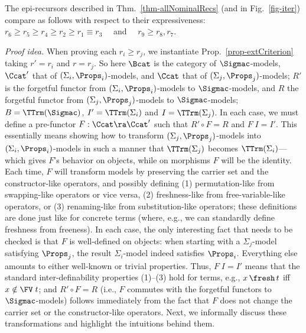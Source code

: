 
\begin{thm} \rm
	\label{thm-expr}
	The epi-recursors described in Thm.~\ref{thm-allNominalRecs} (and in Fig.~\ref{fig-iter}) compare as follows with respect to their expressiveness: 
	 \ \ $r_6 \geq r_5 \geq r_4 \geq r_2 \geq r_1 \equiv r_3$ 
	\ \ and  \ \  $r_9 \geq r_8, r_7$. 
\end{thm} 
\emph{Proof idea.}   
%
%
When proving each 
$r_i \geq r_j$, we instantiate Prop.~\ref{prop-extCriterion} %
taking $r' = r_i$ and $r = r_j$. So here $\Bcat$ is the category of $\Sigmac$-models, $\Ccat'$ that of $(\Sigma_i,\Props_i)$-models, 
and $\Ccat$ that of $(\Sigma_j,\Props_j)$-models; $R'$ 
is the forgetful functor from $(\Sigma_i,\Props_i)$-models to $\Sigmac$-models, and $R$ the forgetful functor from $(\Sigma_j,\Props_j)$-models to $\Sigmac$-models; 
$B=\TTrm(\Sigmac)$, 
$I'=\TTrm(\Sigma_i)$ and $I=\TTrm(\Sigma_j)$.  
%
%
In each case, we must define a pre-functor $F : \Ccat \ra \Ccat'$  
such that 
$R' \circ F = R$ and $F\;I = I'$.  
%
This essentially means showing how to %
transform $(\Sigma_j,\Props_j)$-models into $(\Sigma_i,\Props_i)$-models in such a manner that $\TTrm(\Sigma_j)$ 
becomes $\TTrm(\Sigma_i)$---which gives $F$'s behavior on objects, while on morphisms $F$ will be the identity. Each time, $F$ will transform models by preserving the carrier set and the constructor-like operators, and possibly defining 
(1) permutation-like from swapping-like operators or vice versa, (2) 
freshness-like from 
free-variable-like operators, or (3) renaming-like from substitution-like operators; 
these definitions are done just like for concrete terms (where, e.g., we can standardly define freshness from freeness). In each case, the only interesting fact that needs to be checked is that $F$ is well-defined on objects: when starting with a $\Sigma_j$-model satisfying $\Props_j$, the result $\Sigma_i$-model indeed satisfies $\Props_i$. Everything else %
amounts to either well-known or trivial properties. Thus, $F\;I = I'$ means that the standard inter-definability properties (1)--(3) hold for terms, e.g., $x \,\fresh\, t$ iff $x \notin \FV\;t$; and $R' \circ F = R$ (i.e., $F$ commutes with the forgetful functors to $\Sigmac$-models) follows immediately from the fact that $F$ does not change the carrier set or the constructor-like operators. 
%
Next, we informally discuss these transformations and highlight the intuitions behind them. %

